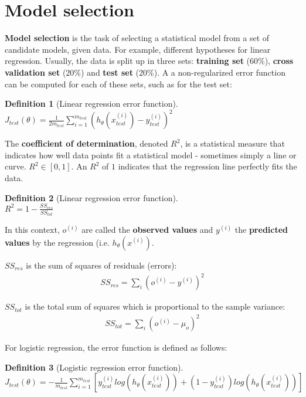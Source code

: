 \documentclass{report}
\newtheorem{definition}{Definition}[section]
\begin{document}
\section{Model selection}
\label{ref:modelselection}
{\bf Model selection} is the task of selecting a statistical model from a set of candidate models, given data. For example, different hypotheses for linear regression. Usually, the data is split up in three sets: {\bf training set} (60\%), {\bf cross validation set} (20\%) and {\bf test set} (20\%). A a non-regularized error function can be computed for each of these sets, such as for the test set:

\begin{definition}[Linear regression error function] ~\\
$J_{test}(\theta) = \frac{1}{2m_{test}}\sum_{i=1}^{m_{test}}(h_{\theta}(x_{test}^{(i)})-y_{test}^{(i)})^2$
\end{definition}

The {\bf coefficient of determination}, denoted {\bf $R^2$}, is a statistical measure that indicates how well data points fit a statistical model - sometimes simply a line or curve.
$R^2 \in [0,1]$. An $R^2$ of $1$ indicates that the regression line perfectly fits the data.

\begin{definition}[Linear regression error function] ~\\
$R^2 = 1 - \frac{SS_{res}}{SS_{tot}}$
\end{definition}

In this context, $o^{(i)}$ are called the {\bf observed values} and $y^{(i)}$ the {\bf predicted values} by the regression (i.e. $h_{\theta}(x^{(i)})$.

$SS_{res}$ is the sum of squares of residuals (errors):
\begin{align*}
SS_{res} = \sum_i(o^{(i)} - y^{(i)})^2
\end{align*}

$SS_{tot}$ is the total sum of squares which is proportional to the sample variance:
\begin{align*}
SS_{tot} = \sum_i(o^{(i)} - \mu_o)^2
\end{align*}


For logistic regression, the error function is defined as follows:

\begin{definition}[Logistic regression error function] ~\\
$J_{test}(\theta) = -\frac{1}{m_{test}}\sum_{i=1}^{m_{test}}[y_{test}^{(i)}log(h_\theta(x_{test}^{(i)}))+(1-y_{test}^{(i)})log(h_\theta(x_{test}^{(i)}))]$
\end{definition}
\end{document}
